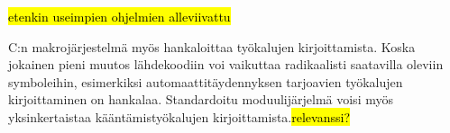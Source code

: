 \hl{etenkin useimpien ohjelmien alleviivattu}

C:n makrojärjestelmä myös hankaloittaa työkalujen kirjoittamista. Koska
jokainen pieni muutos lähdekoodiin voi vaikuttaa radikaalisti saatavilla
oleviin symboleihin, esimerkiksi automaattitäydennyksen tarjoavien työkalujen
kirjoittaminen on hankalaa. Standardoitu moduulijärjelmä voisi myös
yksinkertaistaa kääntämistyökalujen kirjoittamista.\hl{relevanssi?}
